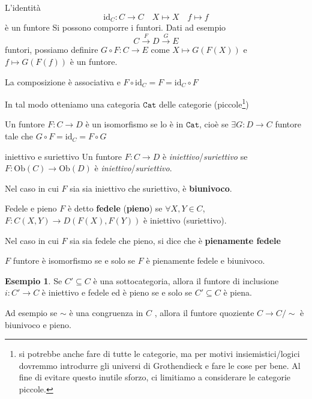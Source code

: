 \documentclass[notitlepage]{report}
\newcounter{theo}[section]\setcounter{theo}{0}
\newcounter{excounter}[section]\setcounter{excounter}{0}
\numberwithin{equation}{section}
\theoremstyle{plain}
\theoremstyle{definition}
\newtheorem{example}[excounter]{Esempio}
\theoremstyle{remark}
\begin{document}
    L'identità
    \[
      \mathrm{id}_C : C \to C \quad X \mapsto X \quad f \mapsto f
    \]
    è un funtore
    Si possono comporre i funtori. Dati ad esempio 
    \[
      C \overset{F}{\to } D \overset{G}{\to } E
    \]
    funtori, possiamo definire \(G \circ F : C \to E\) come \(X \mapsto G{(F{(X)})}\)  e \(f \mapsto G{(F{(f)})}\) è un funtore.

    La composizione è associativa  e \(F \circ \mathrm{id}_C = F = \mathrm{id}_C \circ F\) 

In tal modo otteniamo una categoria \(\mathtt{Cat}\) delle categorie (piccole\footnote{si potrebbe anche fare di tutte le categorie, ma per motivi
insiemistici/logici dovremmo introdurre gli universi di Grothendieck e fare le
cose per bene. Al fine di evitare questo inutile sforzo, ci limitiamo a
considerare le categorie piccole.})

\begin{definition}{}
    Un funtore \(F : C \to D\) è un isomorfismo se lo è in \(\mathtt{Cat}\),
    cioè se \(\exists G : D \to C\)  funtore tale che \(G \circ F = \mathrm{id}_C = F \circ G\) 
\end{definition}

\begin{definition}{iniettivo e suriettivo}
    Un funtore \(F : C \to D\) è \emph{iniettivo}/\emph{suriettivo} se \(F : \mathrm{Ob}{(C)} \to \mathrm{Ob}{(D)}\) è \emph{iniettivo}/\emph{suriettivo}.

    Nel caso in cui \(F\) sia sia iniettivo che suriettivo, è \textbf{biunivoco}.
\end{definition}

\begin{definition}{Fedele e pieno}
    \(F\) è detto \textbf{fedele} (\textbf{pieno}) se \(\forall X, Y \in C\), \(F : C{(X, Y)} \to D{(F{(X)}, F{(Y)})}\) è iniettivo (suriettivo).

    Nel caso in cui \(F\) sia sia fedele che pieno, si dice che è
    \textbf{pienamente fedele}
\end{definition}
\begin{eser}{}
    \(F\) funtore è isomorfismo se e solo se \(F\) è pienamente fedele e
    biunivoco.
\end{eser}


\begin{example}{}
    Se \(C' \subseteq C \) è una sottocategoria, allora il funtore di inclusione
    \(i : C' \to C\) è iniettivo e fedele ed è pieno se e solo se \(C' \subseteq C\) è piena.

    Ad esempio se \(\sim \) è una congruenza in \(C\) , allora il funtore
    quoziente \(C \to C / \sim \) è biunivoco e pieno.
\end{example}
\end{document}
